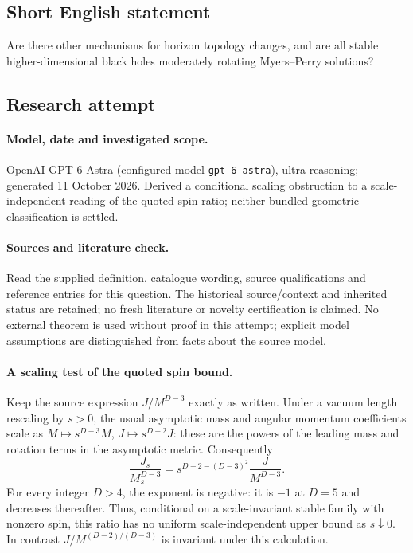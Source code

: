 \documentclass[11pt]{article}
\begin{document}
\subsection{Short English statement}
Are there other mechanisms for horizon topology changes, and are all stable higher-dimensional black holes moderately rotating Myers--Perry solutions?
\subsection{Research attempt}
\paragraph{Model, date and investigated scope.}
OpenAI GPT-6 Astra (configured model \texttt{gpt-6-astra}), ultra reasoning; generated 11 October 2026. Derived a conditional scaling obstruction to a scale-independent reading of the quoted spin ratio; neither bundled geometric classification is settled.

\paragraph{Sources and literature check.}
Read the supplied definition, catalogue wording, source qualifications and reference entries for this question. The historical source/context and inherited status are retained; no fresh literature or novelty certification is claimed. No external theorem is used without proof in this attempt; explicit model assumptions are distinguished from facts about the source model.

\paragraph{A scaling test of the quoted spin bound.} Keep the source expression \(J/M^{D-3}\) exactly as written. Under a vacuum length rescaling by \(s>0\), the usual asymptotic mass and angular momentum coefficients scale as \(M\mapsto s^{D-3}M\), \(J\mapsto s^{D-2}J\): these are the powers of the leading mass and rotation terms in the asymptotic metric. Consequently
\[
 \frac{J_s}{M_s^{D-3}}=s^{D-2-(D-3)^2}\frac{J}{M^{D-3}}.
\]
For every integer \(D>4\), the exponent is negative: it is \(-1\) at \(D=5\) and decreases thereafter. Thus, conditional on a scale-invariant stable family with nonzero spin, this ratio has no uniform scale-independent upper bound as \(s\downarrow0\). In contrast \(J/M^{(D-2)/(D-3)}\) is invariant under this calculation.
\end{document}
